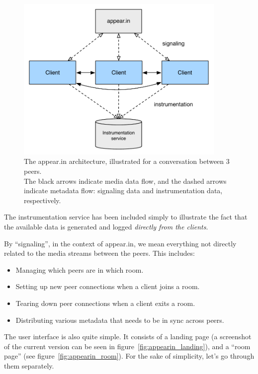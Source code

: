     \begin{figure}[h]
      \centering
        \includegraphics[width=0.9\textwidth]{Figures/appearin-arch}
        \caption{The appear.in architecture, illustrated for a conversation between 3 peers. \\ The black arrows indicate media data flow, and the dashed arrows indicate metadata flow: signaling data and instrumentation data, respectively.}
        \label{fig:appearin_arch}
    \end{figure}

    The instrumentation service has been included simply to illustrate the fact that the available data is generated and logged \emph{directly from the clients}.

    By ``signaling'', in the context of appear.in, we mean everything not directly related to the media streams between the peers. This includes:

    \begin{itemize}
      \item Managing which peers are in which room.
      \item Setting up new peer connections when a client joins a room.
      \item Tearing down peer connections when a client exits a room.
      \item Distributing various metadata that needs to be in sync across peers.
    \end{itemize}

    The user interface is also quite simple. It consists of a landing page (a screenshot of the current version can be seen in figure~\ref{fig:appearin_landing}), and a ``room page'' (see figure~\ref{fig:appearin_room}). For the sake of simplicity, let's go through them separately.

